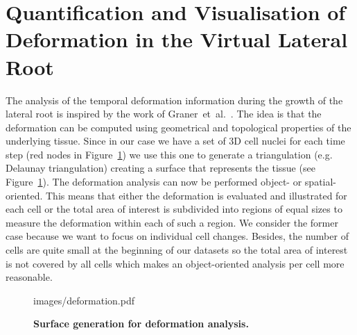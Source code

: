 \documentclass[11pt,a4paper, final]{article}
\begin{document}
\section{Quantification and Visualisation of Deformation in the Virtual Lateral Root}
\noindent
The analysis of the temporal deformation information during the growth of the lateral root is inspired by the work of Graner~et~al.~\cite{graner_et_al_2008}. The idea is that the deformation can be computed using geometrical and topological properties of the underlying tissue. Since in our case we have a set of 3D cell nuclei for each time step (red nodes in Figure~\ref{fig:deformation}) we use this one to generate a triangulation (e.g. Delaunay triangulation) creating a surface that represents the tissue (see Figure~\ref{fig:deformation}). The deformation analysis can now be performed object- or spatial-oriented. This means that either the deformation is evaluated and illustrated for each cell or the total area of interest is subdivided into regions of equal sizes to measure the deformation within each of such a region. We consider the former case because we want to focus on individual cell changes. Besides, the number of cells are quite small at the beginning of our datasets so the total area of interest is not covered by all cells which makes an object-oriented analysis per cell more reasonable.
%
\begin{figure}[htbp]
	\begin{center}
		\begin{overpic}[width=1.\linewidth]{images/deformation.pdf}
		\end{overpic}
\caption[Surface generation for deformation analysis.]
{
{\bf Surface generation for deformation analysis.}
}
	\label{fig:deformation}
	\end{center}
\end{figure}
%
\end{document}
